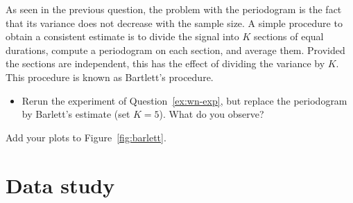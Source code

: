 \documentclass[11pt]{article}
\begin{document}
\begin{solution}
    
\end{solution}

\begin{exercise}\label{q:barlett}
    As seen in the previous question, the problem with the periodogram is the fact that its variance does not decrease with the sample size.
    A simple procedure to obtain a consistent estimate is to divide the signal into $K$ sections of equal durations, compute a periodogram on each section, and average them.
    Provided the sections are independent, this has the effect of dividing the variance by $K$. 
    This procedure is known as Bartlett's procedure.
    \begin{itemize}
        \item Rerun the experiment of Question~\ref{ex:wn-exp}, but replace the periodogram by Barlett's estimate (set $K=5$). What do you observe?
    \end{itemize}
    Add your plots to Figure~\ref{fig:barlett}.
\end{exercise}

\section{Data study}
\end{document}
